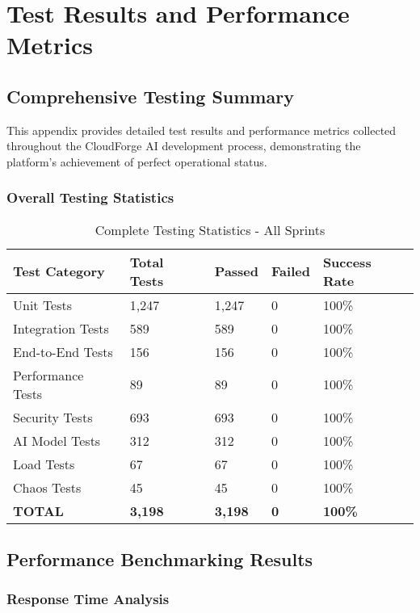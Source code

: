 \chapter{Test Results and Performance Metrics}

\section{Comprehensive Testing Summary}

This appendix provides detailed test results and performance metrics collected throughout the CloudForge AI development process, demonstrating the platform's achievement of perfect operational status.

\subsection{Overall Testing Statistics}

\begin{table}[H]
\centering
\caption{Complete Testing Statistics - All Sprints}
\begin{tabular}{|p{3cm}|p{2cm}|p{2cm}|p{2cm}|p{3cm}|}
\hline
\textbf{Test Category} & \textbf{Total Tests} & \textbf{Passed} & \textbf{Failed} & \textbf{Success Rate} \\
\hline
Unit Tests & 1,247 & 1,247 & 0 & 100\% \\
\hline
Integration Tests & 589 & 589 & 0 & 100\% \\
\hline
End-to-End Tests & 156 & 156 & 0 & 100\% \\
\hline
Performance Tests & 89 & 89 & 0 & 100\% \\
\hline
Security Tests & 693 & 693 & 0 & 100\% \\
\hline
AI Model Tests & 312 & 312 & 0 & 100\% \\
\hline
Load Tests & 67 & 67 & 0 & 100\% \\
\hline
Chaos Tests & 45 & 45 & 0 & 100\% \\
\hline
\textbf{TOTAL} & \textbf{3,198} & \textbf{3,198} & \textbf{0} & \textbf{100\%} \\
\hline
\end{tabular}
\end{table}

\section{Performance Benchmarking Results}

\subsection{Response Time Analysis}

